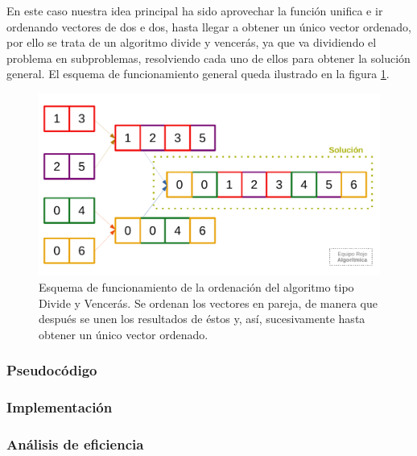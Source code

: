 En este caso nuestra idea principal ha sido aprovechar la función unifica e ir ordenando vectores de dos e dos,
hasta llegar a obtener un único vector ordenado, por ello se trata de un algoritmo divide y vencerás, ya que va dividiendo 
el problema en subproblemas, resolviendo cada uno de ellos para obtener la solución general. El esquema de 
funcionamiento general queda ilustrado en la figura \ref{fig:2b-esquema}. 

\begin{figure}[H]
	\centering
    \includegraphics[scale=0.645]{img/orden_2b.pdf}
	\caption{Esquema de funcionamiento de la ordenación del algoritmo tipo Divide y Vencerás. Se ordenan
	los vectores en pareja, de manera que después se unen los resultados de éstos y, así, sucesivamente
	hasta obtener un único vector ordenado.}
	\label{fig:2b-esquema}
\end{figure}

\subsubsection{Pseudocódigo}



\subsubsection{Implementación}



\subsubsection{Análisis de eficiencia}

